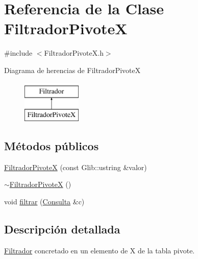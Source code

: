 \hypertarget{classFiltradorPivoteX}{\section{\-Referencia de la \-Clase \-Filtrador\-Pivote\-X}
\label{classFiltradorPivoteX}
}


{\ttfamily \#include $<$\-Filtrador\-Pivote\-X.\-h$>$}

\-Diagrama de herencias de \-Filtrador\-Pivote\-X\begin{figure}[H]
\begin{center}
\leavevmode
\includegraphics[height=2.000000cm]{classFiltradorPivoteX}
\end{center}
\end{figure}
\subsection*{\-Métodos públicos}
\begin{DoxyCompactItemize}
\item 
\hyperlink{classFiltradorPivoteX_af0105c06871741244f626c59fd181a77}{\-Filtrador\-Pivote\-X} (const \-Glib\-::ustring \&valor)
\item 
\hyperlink{classFiltradorPivoteX_a3af2e0db4c29a405f4f8c860b01579c0}{$\sim$\-Filtrador\-Pivote\-X} ()
\item 
void \hyperlink{classFiltradorPivoteX_aac8f278c7e313efdbaca2aea28730c90}{filtrar} (\hyperlink{classConsulta}{\-Consulta} \&c)
\end{DoxyCompactItemize}


\subsection{\-Descripción detallada}
\hyperlink{classFiltrador}{\-Filtrador} concretado en un elemento de \-X de la tabla pivote. 

